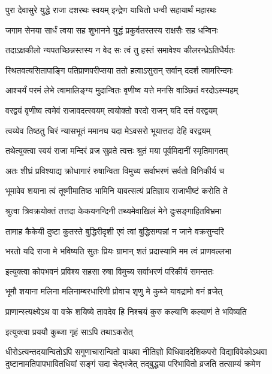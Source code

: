 \twolineshloka
{पुरा देवासुरे युद्धे राजा दशरथः स्वयम्}
{इन्द्रेण याचितो धन्वी सहायार्थं महारथः} %

\twolineshloka
{जगाम सेनया सार्धं त्वया सह शुभानने}
{युद्धं प्रकुर्वतस्तस्य राक्षसैः सह धन्विनः} %

\twolineshloka
{तदाऽक्षकीलो न्यपतच्छिन्नस्तस्य न वेद सः}
{त्वं तु हस्तं समावेश्य कीलरन्ध्रेऽतिधैर्यतः} %

\twolineshloka
{स्थितवत्यसितापाङ्गि पतिप्राणपरीप्सया}
{ततो हत्वाऽसुरान् सर्वान् ददर्श त्वामरिन्दमः} %

\twolineshloka
{आश्चर्यं परमं लेभे त्वामालिङ्ग्य मुदान्वितः}
{वृणीष्व यत्ते मनसि वाञ्छितं वरदोऽस्म्यहम्} %

\twolineshloka
{वरद्वयं वृणीष्व त्वमेवं राजावदत्स्वयम्}
{त्वयोक्तो वरदो राजन् यदि दत्तं वरद्वयम्} %

\twolineshloka
{त्वय्येव तिष्ठतु चिरं न्यासभूतं ममानघ}
{यदा मेऽवसरो भूयात्तदा देहि वरद्वयम्} %

\twolineshloka
{तथेत्युक्त्वा स्वयं राजा मन्दिरं व्रज सुव्रते}
{त्वत्तः श्रुतं मया पूर्वमिदानीं स्मृतिमागतम्} %

\twolineshloka
{अतः शीघ्रं प्रविश्याद्य क्रोधागारं रुषान्विता}
{विमुच्य सर्वाभरणं सर्वतो विनिकीर्य च} %

\twolineshloka
{भूमावेव शयाना त्वं तूष्णीमातिष्ठ भामिनि}
{यावत्सत्यं प्रतिज्ञाय राजाभीष्टं करोति ते} %

\twolineshloka
{श्रुत्वा त्रिवक्रयोक्तं तत्तदा केकयनन्दिनी}
{तथ्यमेवाखिलं मेने दुःसङ्गाहितविभ्रमा} %

\twolineshloka
{तामाह कैकेयी दुष्टा कुतस्ते बुद्धिरीदृशी}
{एवं त्वां बुद्धिसम्पन्नां न जाने वक्रसुन्दरि} %

\twolineshloka
{भरतो यदि राजा मे भविष्यति सुतः प्रियः}
{ग्रामान् शतं प्रदास्यामि मम त्वं प्राणवल्लभा} %

\twolineshloka
{इत्युक्त्वा कोपभवनं प्रविश्य सहसा रुषा}
{विमुच्य सर्वाभरणं परिकीर्य समन्ततः} %

\twolineshloka
{भूमौ शयाना मलिना मलिनाम्बरधारिणी}
{प्रोवाच शृणु मे कुब्जे यावद्रामो वनं व्रजेत्} %

\twolineshloka
{प्राणान्स्त्यक्ष्येऽथ वा वक्रे शयिष्ये तावदेव हि}
{निश्चयं कुरु कल्याणि कल्याणं ते भविष्यति} %

\onelineshloka
{इत्युक्त्वा प्रययौ कुब्जा गृहं साऽपि तथाऽकरोत्} %


\fourlineindentedshloka
{धीरोऽत्यन्तदयान्वितोऽपि सगुणाचारान्वितो वाथवा}
{नीतिज्ञो विधिवाददेशिकपरो विद्याविवेकोऽथवा}
{दुष्टानामतिपापभावितधियां सङ्गं सदा चेद्भजेत्}
{तद्बुद्ध्या परिभावितो व्रजति तत्साम्यं क्रमेण} %

